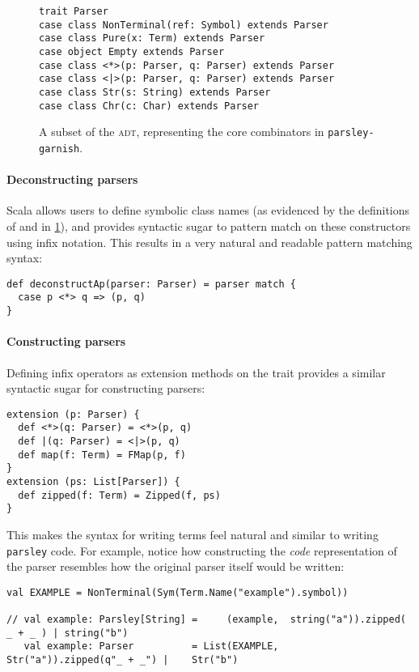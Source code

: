 \documentclass[../../main.tex]{subfiles}
\begin{document}
\begin{figure}[htbp]
\begin{verbatim}
trait Parser
case class NonTerminal(ref: Symbol) extends Parser
case class Pure(x: Term) extends Parser
case object Empty extends Parser
case class <*>(p: Parser, q: Parser) extends Parser
case class <|>(p: Parser, q: Parser) extends Parser
case class Str(s: String) extends Parser
case class Chr(c: Char) extends Parser
\end{verbatim}
\caption{A subset of the  \textsc{adt}, representing the core combinators in \texttt{parsley-garnish}.}
\label{fig:parser-adt}
\end{figure}

\paragraph{Deconstructing parsers}
Scala allows users to define symbolic class names (as evidenced by the definitions of \scala{<*>} and \scala{<|>} in \cref{fig:parser-adt}), and provides syntactic sugar to pattern match on these constructors using infix notation.
This results in a very natural and readable pattern matching syntax:
\begin{verbatim}
def deconstructAp(parser: Parser) = parser match {
  case p <*> q => (p, q)
}
\end{verbatim}

\paragraph{Constructing parsers}
Defining infix operators as extension methods on the  trait provides a similar syntactic sugar for constructing parsers:
\begin{verbatim}
extension (p: Parser) {
  def <*>(q: Parser) = <*>(p, q)
  def |(q: Parser) = <|>(p, q)
  def map(f: Term) = FMap(p, f)
}
extension (ps: List[Parser]) {
  def zipped(f: Term) = Zipped(f, ps)
}
\end{verbatim}
%
This makes the syntax for writing  terms feel natural and similar to writing \texttt{parsley} code.
For example, notice how constructing the \emph{code} representation of the  parser resembles how the original parser itself would be written:
\begin{verbatim}
val EXAMPLE = NonTerminal(Sym(Term.Name("example").symbol))  

// val example: Parsley[String] =     (example,  string("a")).zipped(  _ + _ ) | string("b")
   val example: Parser          = List(EXAMPLE,     Str("a")).zipped(q"_ + _") |    Str("b")
\end{verbatim}
\end{document}
